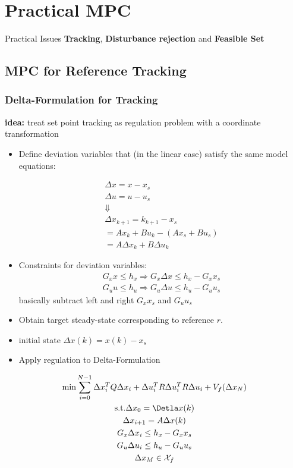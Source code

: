 \section{Practical MPC}
Practical Issues \textbf{Tracking}, \textbf{Disturbance rejection} and \textbf{Feasible Set}
\subsection{MPC for Reference Tracking}
\subsubsection{Delta-Formulation for Tracking}
\textbf{idea:} treat set point tracking as regulation problem with a coordinate transformation
\begin{itemize}
    \item Define deviation variables that (in the linear case) satisfy the same model equations: 
    
    \begin{gather*}
        \Delta x = x-x_s\\ 
        \Delta u =u-u_s\\
        \Downarrow\\
        \Delta x_{k+1} = k_{k+1} -x_s \\
        = Ax_k + Bu_k - (Ax_s+Bu_s)\\
        = A \Delta x_k+ B \Delta u_k
    \end{gather*}
    \item Constraints for deviation variables: 
    \begin{gather*}
        G_xx\leq h_x \Rightarrow G_x\Delta x \leq h_x - G_x x_s \\
        G_uu\leq h_u \Rightarrow G_u \Delta u \leq h_u - G_u u_s 
    \end{gather*}
    basically subtract left and right $G_x x_s $ and $G_u u_s$
    \item Obtain target steady-state corresponding to reference $r$. 
    \item initial state $\Delta x(k) = x(k) - x_s$
    \item Apply regulation to Delta-Formulation
\end{itemize}
\begin{gather*}
    \mathrm{min} \sum^{N-1}_{i=0} \Delta x_i^T Q \Delta x_i + \Delta u_i^TR \Delta u_i^T R \Delta u_i + V_f (\Delta x_N)\\
    \mathrm{s.t.} \Delta x_0 = \Detla x(k)\\
    \Delta x_{i+1}= A \Delta x(k)\\
    G_x\Delta x_i \leq h_x -G_xx_s \\ 
    G_u \Delta u_i \leq h_u -G_u u_s \\
    \Delta x_M \in \mathcal{X}_f
\end{gather*}
